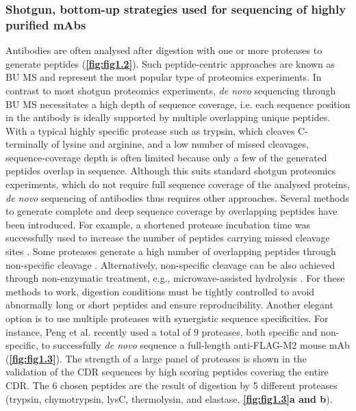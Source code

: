 \subsubsection{Shotgun, bottom-up strategies used for sequencing of highly purified mAbs}
Antibodies are often analysed after digestion with one or more proteases to generate peptides (\textbf{\autoref{fig:fig1.2}}). Such peptide-centric approaches are known as BU MS and represent the most popular type of proteomics experiments. In contrast to most shotgun proteomics experiments, \emph{de novo} sequencing through BU MS necessitates a high depth of sequence coverage, i.e. each sequence position in the antibody is ideally supported by multiple overlapping unique peptides. With a typical highly specific protease such as trypsin, which cleaves C-terminally of lysine and arginine, and a low number of missed cleavages, sequence-coverage depth is often limited because only a few of the generated peptides overlap in sequence. Although this suits standard shotgun proteomics experiments, which do not require full sequence coverage of the analysed proteins, \emph{de novo} sequencing of antibodies thus requires other approaches.
Several methods to generate complete and deep sequence coverage by overlapping peptides have been introduced. For example, a shortened protease incubation time was successfully used to increase the number of peptides carrying missed cleavage sites \cite{morsa2019multi-enzymatic}. Some proteases generate a high number of overlapping peptides through non-specific cleavage \cite{bandeira2008beyond, castellana2010template, guthals2017de}. Alternatively, non-specific cleavage can be also achieved through non-enzymatic treatment, e.g., microwave-assisted hydrolysis \cite{savidor2017database-independent}. For these methods to work, digestion conditions must be tightly controlled to avoid abnormally long or short peptides and ensure reproducibility. Another elegant option is to use multiple proteases with synergistic sequence specificities. For instance, Peng et al. \cite{peng2021mass} recently used a total of 9 proteases, both specific and non-specific, to successfully \emph{de novo} sequence a full-length anti-FLAG-M2 mouse mAb (\textbf{\autoref{fig:fig1.3}}). The strength of a large panel of proteases is shown in the validation of the CDR sequences by high scoring peptides covering the entire CDR. The 6 chosen peptides are the result of digestion by 5 different proteases (trypsin, chymotrypsin, lysC, thermolysin, and elastase, \textbf{\autoref{fig:fig1.3}a and b}).
